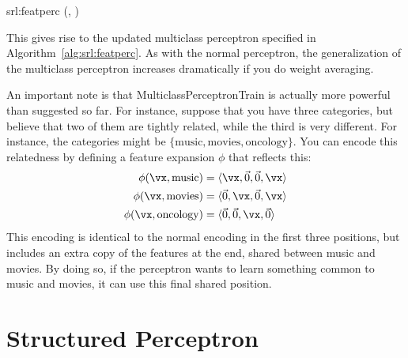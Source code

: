 \newalgorithm%
  {srl:featperc}%
  {(, )}
  {
        \ENDIF
      \ENDFOR
    \ENDFOR
    \RETURN \VAR{$\vw$}
  }

This gives rise to the updated multiclass perceptron specified in Algorithm~\ref{alg:srl:featperc}.
As with the normal perceptron, the generalization of the multiclass perceptron increases dramatically if you do weight averaging.

An important note is that MulticlassPerceptronTrain is actually more powerful than suggested so far.
For instance, suppose that you have three categories, but believe that two of them are tightly related, while the third is very different.
For instance, the categories might be $\{ \text{music}, \text{movies}, \text{oncology} \}$.
You can encode this relatedness by defining a feature expansion $\phi$ that reflects this:
\begin{align}
  \phi(\vx, \text{music})    &= \langle \vx,    \vec 0, \vec 0, \vx \rangle \\
  \phi(\vx, \text{movies})   &= \langle \vec 0, \vx   , \vec 0, \vx \rangle \\
  \phi(\vx, \text{oncology}) &= \langle \vec 0, \vec 0, \vx   , \vec 0 \rangle
\end{align}
This encoding is identical to the normal encoding in the first three positions, but includes an extra copy of the features at the end, shared between music and movies.
By doing so, if the perceptron wants to learn something common to music and movies, it can use this final shared position.

\section{Structured Perceptron}


